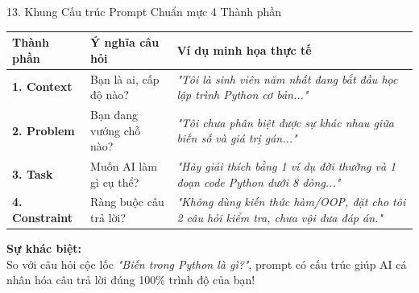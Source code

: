 \documentclass[aspectratio=169, 10pt]{beamer}
\begin{document}
\begin{frame}{13. Khung Cấu trúc Prompt Chuẩn mực 4 Thành phần}
  \scriptsize
  \begin{tabularx}{\textwidth}{l p{3.2cm} X}
    \toprule
    \textbf{Thành phần} & \textbf{Ý nghĩa câu hỏi} & \textbf{Ví dụ minh họa thực tế} \\
    \midrule
    \textbf{1. Context} & Bạn là ai, cấp độ nào? & \textit{"Tôi là sinh viên năm nhất đang bắt đầu học lập trình Python cơ bản..."} \\
    \textbf{2. Problem} & Bạn đang vướng chỗ nào? & \textit{"Tôi chưa phân biệt được sự khác nhau giữa biến số và giá trị gán..."} \\
    \textbf{3. Task} & Muốn AI làm gì cụ thể? & \textit{"Hãy giải thích bằng 1 ví dụ đời thường và 1 đoạn code Python dưới 8 dòng..."} \\
    \textbf{4. Constraint} & Ràng buộc câu trả lời? & \textit{"Không dùng kiến thức hàm/OOP, đặt cho tôi 2 câu hỏi kiểm tra, chưa vội đưa đáp án."} \\
    \bottomrule
  \end{tabularx}
  \vspace{0.15cm}
  \begin{tcolorbox}[colback=secondarygreen!8, colframe=secondarygreen, arc=3pt, left=8pt, right=8pt, top=3pt, bottom=3pt]
    \textbf{\footnotesize Sự khác biệt:}\\
    \footnotesize So với câu hỏi cộc lốc \textit{"Biến trong Python là gì?"}, prompt có cấu trúc giúp AI cá nhân hóa câu trả lời đúng 100\% trình độ của bạn!
  \end{tcolorbox}
\end{frame}
\end{document}
